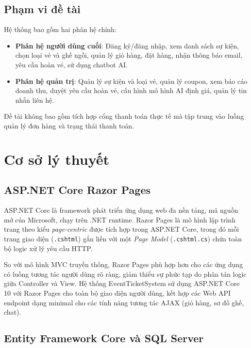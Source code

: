 \documentclass[../main.tex]{subfiles}
\begin{document}
\subsection{Phạm vi đề tài}

Hệ thống bao gồm hai phân hệ chính:

\begin{itemize}
    \item \textbf{Phân hệ người dùng cuối}: Đăng ký/đăng nhập, xem danh sách sự kiện, chọn loại vé và ghế ngồi, quản lý giỏ hàng, đặt hàng, nhận thông báo email, yêu cầu hoàn vé, sử dụng chatbot AI.
    \item \textbf{Phân hệ quản trị}: Quản lý sự kiện và loại vé, quản lý coupon, xem báo cáo doanh thu, duyệt yêu cầu hoàn vé, cấu hình mô hình AI định giá, quản lý tin nhắn liên hệ.
\end{itemize}

Đề tài không bao gồm tích hợp cổng thanh toán thực tế mà tập trung vào luồng quản lý đơn hàng và trạng thái thanh toán.

\section{Cơ sở lý thuyết}

\subsection{ASP.NET Core Razor Pages}

ASP.NET Core là framework phát triển ứng dụng web đa nền tảng, mã nguồn mở của Microsoft, chạy trên .NET runtime. Razor Pages là mô hình lập trình trang theo kiểu \textit{page-centric} được tích hợp trong ASP.NET Core, trong đó mỗi trang giao diện (\texttt{.cshtml}) gắn liền với một \textit{Page Model} (\texttt{.cshtml.cs}) chứa toàn bộ logic xử lý yêu cầu HTTP.

So với mô hình MVC truyền thống, Razor Pages phù hợp hơn cho các ứng dụng có luồng tương tác người dùng rõ ràng, giảm thiểu sự phức tạp do phân tán logic giữa Controller và View. Hệ thống EventTicketSystem sử dụng ASP.NET Core 10 với Razor Pages cho toàn bộ giao diện người dùng, kết hợp các Web API endpoint dạng minimal cho các tính năng tương tác AJAX (giỏ hàng, sơ đồ ghế, chat).

\subsection{Entity Framework Core và SQL Server}
\end{document}
